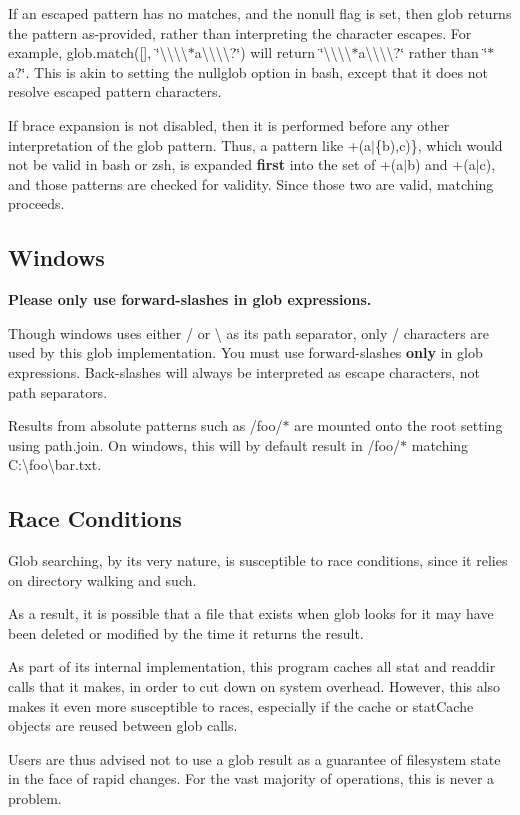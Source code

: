 If an escaped pattern has no matches, and the {\ttfamily nonull} flag is set, then glob returns the pattern as-\/provided, rather than interpreting the character escapes. For example, {\ttfamily glob.\+match(\mbox{[}\mbox{]}, \char`\"{}\textbackslash{}\textbackslash{}\textbackslash{}\textbackslash{}$\ast$a\textbackslash{}\textbackslash{}\textbackslash{}\textbackslash{}?\char`\"{})} will return {\ttfamily \char`\"{}\textbackslash{}\textbackslash{}\textbackslash{}\textbackslash{}$\ast$a\textbackslash{}\textbackslash{}\textbackslash{}\textbackslash{}?\char`\"{}} rather than {\ttfamily \char`\"{}$\ast$a?\char`\"{}}. This is akin to setting the {\ttfamily nullglob} option in bash, except that it does not resolve escaped pattern characters.

If brace expansion is not disabled, then it is performed before any other interpretation of the glob pattern. Thus, a pattern like {\ttfamily +(a$\vert$\{b),c)\}}, which would not be valid in bash or zsh, is expanded {\bfseries first} into the set of {\ttfamily +(a$\vert$b)} and {\ttfamily +(a$\vert$c)}, and those patterns are checked for validity. Since those two are valid, matching proceeds.

\subsection*{Windows}

{\bfseries Please only use forward-\/slashes in glob expressions.}

Though windows uses either {\ttfamily /} or {\ttfamily \textbackslash{}} as its path separator, only {\ttfamily /} characters are used by this glob implementation. You must use forward-\/slashes {\bfseries only} in glob expressions. Back-\/slashes will always be interpreted as escape characters, not path separators.

Results from absolute patterns such as {\ttfamily /foo/$\ast$} are mounted onto the root setting using {\ttfamily path.\+join}. On windows, this will by default result in {\ttfamily /foo/$\ast$} matching {\ttfamily C\+:\textbackslash{}foo\textbackslash{}bar.\+txt}.

\subsection*{Race Conditions}

Glob searching, by its very nature, is susceptible to race conditions, since it relies on directory walking and such.

As a result, it is possible that a file that exists when glob looks for it may have been deleted or modified by the time it returns the result.

As part of its internal implementation, this program caches all stat and readdir calls that it makes, in order to cut down on system overhead. However, this also makes it even more susceptible to races, especially if the cache or stat\+Cache objects are reused between glob calls.

Users are thus advised not to use a glob result as a guarantee of filesystem state in the face of rapid changes. For the vast majority of operations, this is never a problem. 